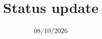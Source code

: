 \documentclass[aspectratio=169,hyperref={pdfpagelabels=false}]{beamer}
\title{Status update}
\subtitle{08/10/2026}
\begin{document}
\inserttitlepage
%






\end{document}
